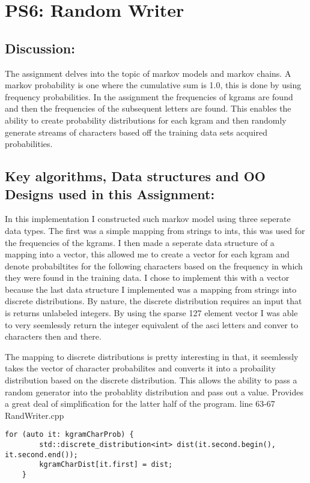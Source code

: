 \section{PS6: Random Writer}\label{sec:ps6}
\graphicspath{{ps6}}
\subsection{Discussion:}\label{sec:ps6:disc}
The assignment delves into the topic of markov models and markov chains. A markov probability is one where the cumulative sum is 1.0, this is done by using frequency probabilities. 
In the assignment the frequencies of kgrams are found and then the frequencies of the subsequent letters are found. This enables the ability to create probability distributions for each kgram and
then randomly generate streams of characters based off the training data sets acquired probabilities. 

\subsection{Key algorithms, Data structures and OO Designs used in this Assignment:}
In this implementation I constructed such markov model using three seperate data types. The first was a simple mapping from strings to ints, this was used for the frequencies of the kgrams. 
I then made a seperate data structure of a mapping into a vector, this allowed me to create a vector for each kgram and denote probabiltites for the following characters based on the frequency in which they were 
found in the training data. I chose to implement this with a vector because the last data structure I implemented was a mapping from strings into discrete distributions. By nature, the discrete distribution requires an input that is returns unlabeled integers. 
By using the sparse 127 element vector I was able to very seemlessly return the integer equivalent of the asci letters and conver to characters then and there. 

The mapping to discrete distributions is pretty interesting in that, it seemlessly takes the vector of character probabilites and converts it into a probaility distribution 
based on the discrete distribution. This allows the ability to pass a random generator into the probablity distribution and pass out a value. Provides a great deal of simplification for the latter half of the program. 
line 63-67 RandWriter.cpp

 \begin{lstlisting}
for (auto it: kgramCharProb) {
        std::discrete_distribution<int> dist(it.second.begin(), it.second.end());
        kgramCharDist[it.first] = dist;
    }
 \end{lstlisting}

